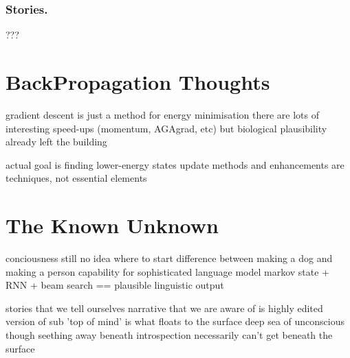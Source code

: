 \documentclass[citeauthoryear]{llncs}
\begin{document}
\subsubsection*{Stories.}
  ???
  

\section{BackPropagation Thoughts}
  gradient descent is just a method for energy minimisation
    there are lots of interesting speed-ups (momentum, AGAgrad, etc)
      but biological plausibility already left the building
      
    actual goal is finding lower-energy states
      update methods and enhancements are techniques, not essential elements


\section{The Known Unknown}

conciousness 
  still no idea where to start
  difference between making a dog and making a person
    capability for sophisticated language model
      markov state + RNN + beam search == plausible linguistic output
  
  stories that we tell ourselves
    narrative that we are aware of is highly edited version of sub
      'top of mind' is what floats to the surface
      deep sea of unconscious though seething away beneath
  introspection necessarily can't get beneath the surface
\end{document}
